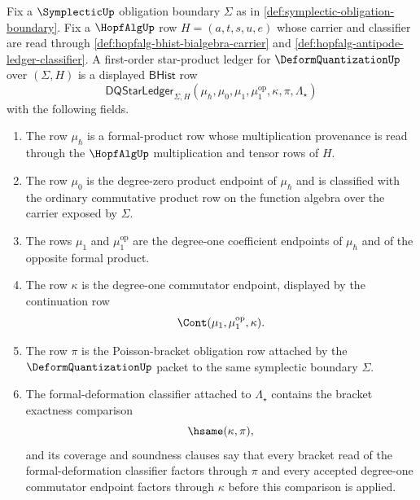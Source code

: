 \begin{definition}
\label{def:deformquantization-first-order-star-product-ledger}
Fix a $\SymplecticUp$ obligation boundary $\Sigma$ as in \autoref{def:symplectic-obligation-boundary}. Fix a $\HopfAlgUp$ row $H=(a,t,s,u,e)$ whose carrier and classifier are read through \autoref{def:hopfalg-bhist-bialgebra-carrier} and \autoref{def:hopfalg-antipode-ledger-classifier}. A first-order star-product ledger for $\DeformQuantizationUp$ over $(\Sigma,H)$ is a displayed $\mathsf{BHist}$ row
$$
\mathsf{DQStarLedger}_{\Sigma,H}(\mu_\hbar,\mu_0,\mu_1,\mu_1^{\mathrm{op}},\kappa,\pi,\Lambda_\star)
$$
with the following fields.
\begin{enumerate}
  \item The row $\mu_\hbar$ is a formal-product row whose multiplication provenance is read through the $\HopfAlgUp$ multiplication and tensor rows of $H$.
  \item The row $\mu_0$ is the degree-zero product endpoint of $\mu_\hbar$ and is classified with the ordinary commutative product row on the function algebra over the carrier exposed by $\Sigma$.
  \item The rows $\mu_1$ and $\mu_1^{\mathrm{op}}$ are the degree-one coefficient endpoints of $\mu_\hbar$ and of the opposite formal product.
  \item The row $\kappa$ is the degree-one commutator endpoint, displayed by the continuation row
$$
\Cont(\mu_1,\mu_1^{\mathrm{op}},\kappa).
$$
  \item The row $\pi$ is the Poisson-bracket obligation row attached by the $\DeformQuantizationUp$ packet to the same symplectic boundary $\Sigma$.
  \item The formal-deformation classifier attached to $\Lambda_\star$ contains the bracket exactness comparison
$$
\hsame(\kappa,\pi),
$$
and its coverage and soundness clauses say that every bracket read of the formal-deformation classifier factors through $\pi$ and every accepted degree-one commutator endpoint factors through $\kappa$ before this comparison is applied.
\end{enumerate}
\end{definition}

